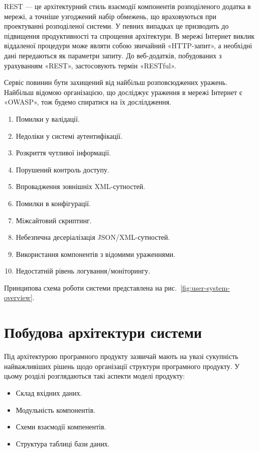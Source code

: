 REST — це архітектурний стиль взаємодії компонентів розподіленого додатка в мережі,
а точніше узгоджений набір обмежень, що враховуються при проектуванні розподіленої системи.
У певних випадках це призводить до підвищення продуктивності та спрощення архітектури.
В мережі Інтернет виклик віддаленої процедури може являти собою звичайний «HTTP-запит»,
а необхідні дані передаються як параметри запиту.
До веб-додатків, побудованих з урахуванням «REST», застосовують термін «RESTful».

Сервіс повинин бути захищений від найбільш розповсюджених уражень.
Найбільш відомою організацією, що досліджує ураження в мережі Інтернет є «OWASP»,
тож будемо спиратися на їх дослілдження.

\begin{enumerate}
  \item Помилки у валідації.
  \item Недоліки у системі аутентифікації.
  \item Розкриття чутливої інформації.
  \item Порушений контроль доступу.
  \item Впровадження зовнішніх XML-сутностей.
  \item Помилки в конфігурації.
  \item Міжсайтовий скриптинг.
  \item Небезпечна десеріалізація JSON/XML-сутностей.
  \item Використання компонентів з відомими ураженнями.
  \item Недостатній рівень логування/моніторингу.
\end{enumerate}

Принципова схема роботи системи представлена на рис.~\ref{fig:user-system-overview}.

\section{Побудова архітектури системи}

Під архітектурою програмного продукту зазвичай мають на увазі
сукупність найважливіших рішень щодо організації структури програмного
продукту.
У цьому розділі розглядаються такі аспекти моделі продукту:

\begin{itemize}
  \item Склад вхідних даних.
  \item Модульність компонентів.
  \item Схеми взаємодії компенентів.
  \item Структура таблиці бази даних.
\end{itemize}

